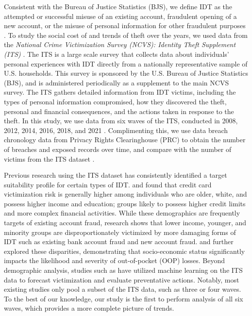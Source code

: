 Consistent with the Bureau of Justice Statistics (BJS), we define IDT as the attempted or successful misuse of an existing account, fraudulent opening of a new account, or the misuse of personal information for other fraudulent purposes \cite{HarrellThompson2024, Harrell2024Stats}. To study the social cost of  and trends of theft over the years, we used data from the \textit{National Crime Victimization Survey (NCVS): Identity Theft Supplement (ITS)} \cite{ICPSR26362, ICPSR34735, ICPSR36044, ICPSR36829, ICPSR37923, ICPSR38501}. The ITS is a large scale survey that collects data about individuals' personal experiences with IDT directly from a nationally representative sample of U.S. households. This survey is sponsored by the U.S. Bureau of Justice Statistics (BJS), and is administered periodically as a supplement to the main NCVS survey. The ITS gathers detailed information from IDT victims, including the types of personal information compromised, how they discovered the theft, personal and financial consequences, and the actions taken in response to the theft. In this study, we use data from six waves of the ITS, conducted in 2008, 2012, 2014, 2016, 2018, and 2021 \cite{ICPSR26362, ICPSR34735, ICPSR36044, ICPSR36829, ICPSR37923, ICPSR38501}. Complimenting this, we use data breach chronology data from Privacy Rights Clearinghouse (PRC) to obtain the number of breaches and exposed records over time, and compare with the number of victims from the ITS dataset \cite{PRC_Chronology}.

Previous research using the ITS dataset has consistently identified a target suitability profile for certain types of IDT. \citet{Nevin2025} and \citet{Copes2010} found that credit card victimization risk is generally higher among individuals who are older, white, and possess higher income and education; groups likely to possess higher credit limits and more complex financial activities. While these demographics are frequently targets of existing account fraud, research shows that lower income, younger, and minority groups are disproportionately victimized by more damaging forms of IDT such as existing bank account fraud and new account fraud. \citet{Reynolds2021Differential} and \citet{DeLiema2021} further explored these disparities, demonstrating that socio-economic status significantly impacts the likelihood and severity of out-of-pocket (OOP) losses. Beyond demographic analysis, studies such as \cite{Hu2021Forecasting} have utilized machine learning on the ITS data to forecast victimization and evaluate preventative actions. Notably, most existing studies only pool a subset of the ITS data, such as three or four waves. To the best of our knowledge, our study is the first to perform analysis of all six waves, which provides a more complete picture of trends. 

